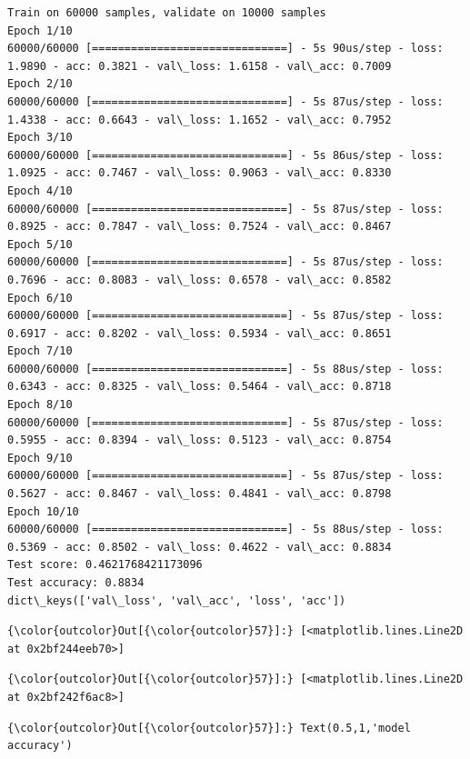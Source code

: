\documentclass[11pt]{article}
\begin{document}
    \begin{Verbatim}[commandchars=\\\{\}]
Train on 60000 samples, validate on 10000 samples
Epoch 1/10
60000/60000 [==============================] - 5s 90us/step - loss: 1.9890 - acc: 0.3821 - val\_loss: 1.6158 - val\_acc: 0.7009
Epoch 2/10
60000/60000 [==============================] - 5s 87us/step - loss: 1.4338 - acc: 0.6643 - val\_loss: 1.1652 - val\_acc: 0.7952
Epoch 3/10
60000/60000 [==============================] - 5s 86us/step - loss: 1.0925 - acc: 0.7467 - val\_loss: 0.9063 - val\_acc: 0.8330
Epoch 4/10
60000/60000 [==============================] - 5s 87us/step - loss: 0.8925 - acc: 0.7847 - val\_loss: 0.7524 - val\_acc: 0.8467
Epoch 5/10
60000/60000 [==============================] - 5s 87us/step - loss: 0.7696 - acc: 0.8083 - val\_loss: 0.6578 - val\_acc: 0.8582
Epoch 6/10
60000/60000 [==============================] - 5s 87us/step - loss: 0.6917 - acc: 0.8202 - val\_loss: 0.5934 - val\_acc: 0.8651
Epoch 7/10
60000/60000 [==============================] - 5s 88us/step - loss: 0.6343 - acc: 0.8325 - val\_loss: 0.5464 - val\_acc: 0.8718
Epoch 8/10
60000/60000 [==============================] - 5s 87us/step - loss: 0.5955 - acc: 0.8394 - val\_loss: 0.5123 - val\_acc: 0.8754
Epoch 9/10
60000/60000 [==============================] - 5s 87us/step - loss: 0.5627 - acc: 0.8467 - val\_loss: 0.4841 - val\_acc: 0.8798
Epoch 10/10
60000/60000 [==============================] - 5s 88us/step - loss: 0.5369 - acc: 0.8502 - val\_loss: 0.4622 - val\_acc: 0.8834
Test score: 0.4621768421173096
Test accuracy: 0.8834
dict\_keys(['val\_loss', 'val\_acc', 'loss', 'acc'])

    \end{Verbatim}

\begin{Verbatim}[commandchars=\\\{\}]
{\color{outcolor}Out[{\color{outcolor}57}]:} [<matplotlib.lines.Line2D at 0x2bf244eeb70>]
\end{Verbatim}
            
\begin{Verbatim}[commandchars=\\\{\}]
{\color{outcolor}Out[{\color{outcolor}57}]:} [<matplotlib.lines.Line2D at 0x2bf242f6ac8>]
\end{Verbatim}
            
\begin{Verbatim}[commandchars=\\\{\}]
{\color{outcolor}Out[{\color{outcolor}57}]:} Text(0.5,1,'model accuracy')
\end{Verbatim}
            
\end{document}
